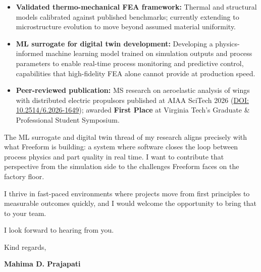\documentclass[11pt, a4paper]{article}
\begin{document}
\begin{itemize}[leftmargin=1.5em, itemsep=2pt]
    \item \textbf{Validated thermo-mechanical FEA framework:} Thermal and structural models calibrated against published benchmarks; currently extending to microstructure evolution to move beyond assumed material uniformity.
    \item \textbf{ML surrogate for digital twin development:} Developing a physics-informed machine learning model trained on simulation outputs and process parameters to enable real-time process monitoring and predictive control, capabilities that high-fidelity FEA alone cannot provide at production speed.
    \item \textbf{Peer-reviewed publication:} MS research on aeroelastic analysis of wings with distributed electric propulsors published at AIAA SciTech 2026 (\href{https://doi.org/10.2514/6.2026-1649}{DOI: 10.2514/6.2026-1649}); awarded \textbf{First Place} at Virginia Tech's Graduate \& Professional Student Symposium.
\end{itemize}

The ML surrogate and digital twin thread of my research aligns precisely with what Freeform is building: a system where software closes the loop between process physics and part quality in real time. I want to contribute that perspective from the simulation side to the challenges Freeform faces on the factory floor.

I thrive in fast-paced environments where projects move from first principles to measurable outcomes quickly, and I would welcome the opportunity to bring that to your team.

I look forward to hearing from you.

\vspace{16pt}
Kind regards,

\vspace{32pt}
\textbf{Mahima D. Prajapati}
\end{document}
